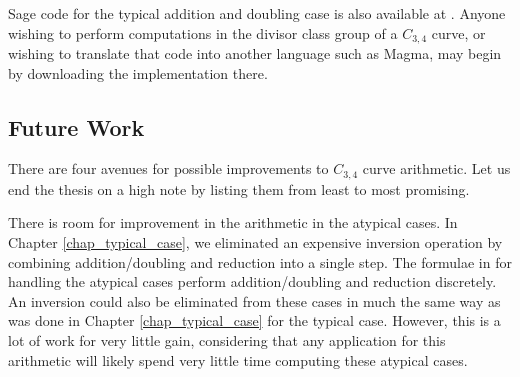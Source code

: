 Sage code for the typical addition and doubling case is also available at \cite{github}.
Anyone wishing to perform computations in the divisor class group of a $C_{3,4}$ curve,
or wishing to translate that code into another language such as Magma,
may begin by downloading the implementation there.





\subsection{Future Work}
\label{sec_future_work}

There are four avenues for possible improvements to $C_{3,4}$ curve arithmetic.
Let us end the thesis on a high note by listing them from least to most promising.

There is room for improvement in the arithmetic in the atypical cases.
In Chapter \ref{chap_typical_case}, we eliminated an expensive inversion operation
by combining addition/doubling and reduction into a single step.
The formulae in \cite{github} for handling the atypical cases perform addition/doubling and reduction discretely.
An inversion could also be eliminated from these cases
in much the same way as was done in Chapter \ref{chap_typical_case} for the typical case.
However, this is a lot of work for very little gain,
considering that any application for this arithmetic will likely spend very little time computing these atypical cases.

